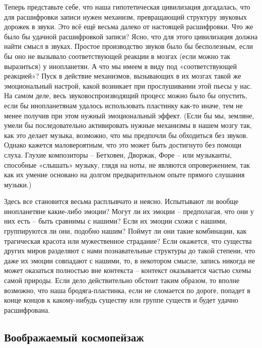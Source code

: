 \documentclass[../main.tex]{subfiles}
\begin{document}
Теперь представьте себе, что наша гипотетическая цивилизация догадалась, что для расшифровки записи нужен механизм, превращающий структуру звуковых дорожек в звуки. Это всё ещё весьма далеко от настоящей расшифровки. Что же было бы удачной расшифровкой записи? Ясно, что для этого цивилизация должна найти смысл в звуках. Простое производство звуков было бы бесполезным, если бы оно не вызывало соответствующей реакции в мозгах (если можно так выразиться) у инопланетян. А что мы имеем в виду под «соответствующей реакцией»? Пуск в действие механизмов, вызывающих в их мозгах такой же эмоциональный настрой, какой возникает при прослушивании этой пьесы у нас. На самом деле, весь звуковоспроизводящий процесс можно было бы опустить, если бы инопланетянам удалось использовать пластинку как-то иначе, тем не менее получив при этом нужный эмоциональный эффект. (Если бы мы, земляне, умели бы последовательно активировать нужные механизмы в нашем мозгу так, как это делает музыка, возможно, что мы предпочли бы обходиться без звуков. Однако кажется маловероятным, что это может быть достигнуто без помощи слуха. Глухие композиторы \--- Бетховен, Дворжак, Форе \--- или музыканты, способные «слышать» музыку, глядя на ноты, не являются опровержением, так как их умение основано на долгом предварительном опыте прямого слушания музыки.)

Здесь все становится весьма расплывчато и неясно. Испытывают ли вообще инопланетяне какие-либо эмоции? Могут ли их эмоции \--- предполагая, что они у них есть \--- быть сравнимы с нашими? Если их эмоции схожи с нашими, группируются ли они, подобно нашим? Поймут ли они такие комбинации, как трагическая красота или мужественное страдание? Если окажется, что существа других миров разделяют с нами познавательные структуры до такой степени, что даже их эмоции совпадают с нашими, то, в некотором смысле, запись никогда не может оказаться полностью вне контекста \--- контекст оказывается частью схемы самой природы. Если дело действительно обстоит таким образом, то вполне возможно, что наша бродяга-пластинка, если не сломается по дороге, попадет в конце концов к какому-нибудь существу или группе существ и будет удачно расшифрована.


\subsection{Воображаемый космопейзаж}
\end{document}
